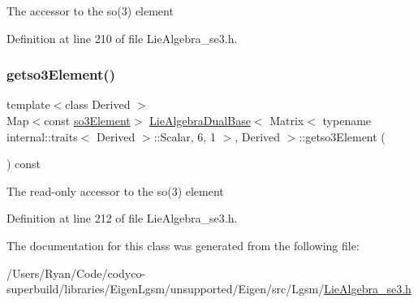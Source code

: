 The accessor to the so(3) element 

Definition at line 210 of file Lie\+Algebra\+\_\+se3.\+h.

\hypertarget{class_lie_algebra_dual_base_3_01_matrix_3_01typename_01internal_1_1traits_3_01_derived_01_4_1_1_7557dc73cbfcbc32e399b9855a977d47_a4c042c5fddf9a999e414d5f1b36a4221}{}\label{class_lie_algebra_dual_base_3_01_matrix_3_01typename_01internal_1_1traits_3_01_derived_01_4_1_1_7557dc73cbfcbc32e399b9855a977d47_a4c042c5fddf9a999e414d5f1b36a4221} 
\subsubsection{\texorpdfstring{getso3\+Element()}{getso3Element()}\hspace{0.1cm}{\footnotesize\ttfamily [2/2]}}
{\footnotesize\ttfamily template$<$class Derived $>$ \\
Map$<$const \hyperlink{class_lie_algebra_dual_base_3_01_matrix_3_01typename_01internal_1_1traits_3_01_derived_01_4_1_1_7557dc73cbfcbc32e399b9855a977d47_ab33be35099ff8bda572467ce899de5aa}{so3\+Element}$>$ \hyperlink{class_lie_algebra_dual_base}{Lie\+Algebra\+Dual\+Base}$<$ Matrix$<$ typename internal\+::traits$<$ Derived $>$\+::Scalar, 6, 1 $>$, Derived $>$\+::getso3\+Element (\begin{DoxyParamCaption}{ }\end{DoxyParamCaption}) const\hspace{0.3cm}{\ttfamily [inline]}}

The read-\/only accessor to the so(3) element 

Definition at line 212 of file Lie\+Algebra\+\_\+se3.\+h.



The documentation for this class was generated from the following file\+:\begin{DoxyCompactItemize}
\item 
/\+Users/\+Ryan/\+Code/codyco-\/superbuild/libraries/\+Eigen\+Lgsm/unsupported/\+Eigen/src/\+Lgsm/\hyperlink{_lie_algebra__se3_8h}{Lie\+Algebra\+\_\+se3.\+h}\end{DoxyCompactItemize}
